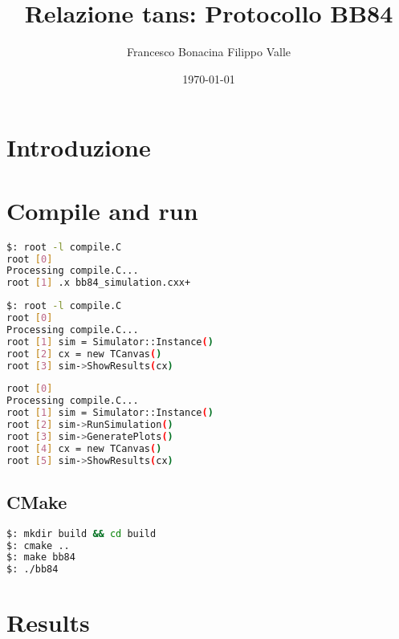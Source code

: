 \documentclass[11 pt, a4paper]{article}
\author{Francesco Bonacina  Filippo Valle}
\date{\today}
\title{Relazione tans: Protocollo BB84}
\begin{document}
\maketitle

\thispagestyle{empty}
\tableofcontents

\section{Introduzione}

\section{Compile and run}

\begin{lstlisting}[language=bash, style=myRoot]
$: root -l compile.C
root [0] 
Processing compile.C...
root [1] .x bb84_simulation.cxx+
\end{lstlisting}

\begin{lstlisting}[language=bash, style=myRoot]
$: root -l compile.C
root [0] 
Processing compile.C...
root [1] sim = Simulator::Instance()
root [2] cx = new TCanvas()
root [3] sim->ShowResults(cx) 
\end{lstlisting}


\begin{lstlisting}[language=bash, style=myRoot]
root [0] 
Processing compile.C...
root [1] sim = Simulator::Instance()
root [2] sim->RunSimulation()
root [3] sim->GeneratePlots()
root [4] cx = new TCanvas()
root [5] sim->ShowResults(cx)
\end{lstlisting}


\subsection{CMake}
\begin{lstlisting}[language=bash]
$: mkdir build && cd build
$: cmake ..
$: make bb84
$: ./bb84
\end{lstlisting}

\section{Results}
\end{document}
